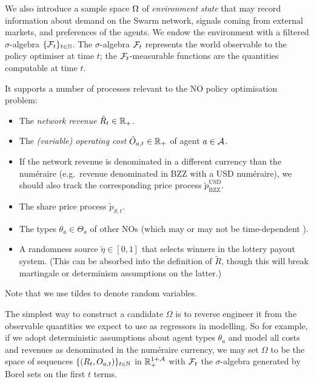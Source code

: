 We also introduce a sample space $\Omega$ of \emph{environment state} that may record information about demand on the Swarm network, signals coming from external markets, and preferences of the agents.
%
We endow the environment with a filtered $\sigma$-algebra $\{\mathcal{F}_t\}_{t\in\mathbb{N}}$.
%
The $\sigma$-algebra $\mathcal{F}_t$ represents the world observable to the policy optimiser at time $t$; the $\mathcal{F}_t$-measurable functions are the quantities computable at time $t$.

It supports a number of processes relevant to the NO policy optimisation problem:
\begin{itemize}
  \item The \emph{network revenue} $\tilde{R}_t\in \mathbb{R}_+$.
  \item The \emph{(variable) operating cost} $\tilde{O}_{a,t}\in\mathbb{R}_+$ of agent $a\in\mathcal{A}$.
  \item If the network revenue is denominated in a different currency than the num\'eraire (e.g.~revenue denominated in BZZ with a USD num\'eraire), we should also track the corresponding price process $\tilde p_\mathrm{BZZ}^\mathrm{USD}$.
  \item The share price process $\tilde{p}_{S,t}$.
  \item The types $\theta_a\in\Theta_a$ of other NOs (which may or may not be time-dependent \cite{bergemann2019dynamic}).
  \item 
    A randomness source $\tilde \eta \in [0,1]$ that selects winners in the lottery payout system. (This can be absorbed into the definition of $\tilde{R}$, though this will break martingale or determinism assumptions on the latter.)
\end{itemize}
%
Note that we use tildes to denote random variables.

\begin{example}

  The simplest way to construct a candidate $\Omega$ is to reverse engineer it from the observable quantities we expect to use as regressors in modelling.
  So for example, if we adopt deterministic assumptions about agent types $\theta_a$ and model all costs and revenues as denominated in the num\'eraire currency, we may set $\Omega$ to be the space of sequences $\{(R_t,O_{a,t})\}_{t\in\mathbb{N}}$ in $\mathbb{R}_+^{1+\mathcal{A}}$ with $\mathcal{F}_t$ the $\sigma$-algebra generated by Borel sets on the first $t$ terms.

\end{example}

